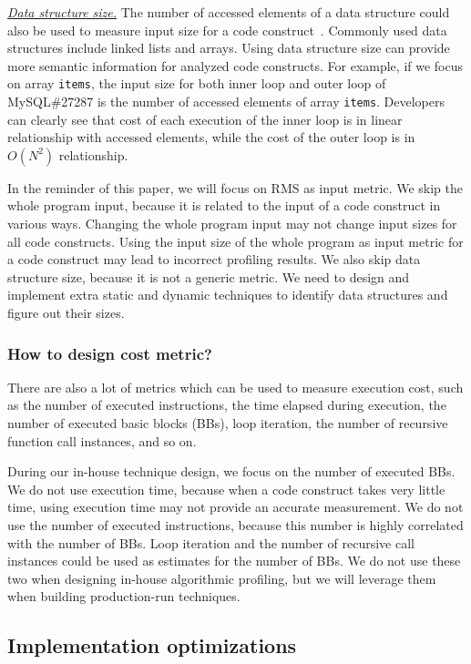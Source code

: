 {\underline{\textit{Data structure size.}}}
The number of accessed elements of a data 
structure could also be used to measure 
input size for a code construct~\cite{AlgoProf}. 
Commonly used data structures include linked lists and arrays.
Using data structure size can provide more semantic information for 
analyzed code constructs.
For example, if we focus on array \texttt{items}, 
the input size for both 
inner loop and outer loop of MySQL\#27287 is 
the number of accessed elements of array \texttt{items}.
Developers can clearly see that cost of each execution 
of the inner loop is in linear relationship with accessed elements, 
while the cost of the outer loop is in $O(N^2)$ relationship. 

In the reminder of this paper, we will focus on RMS as input metric. 
We skip the whole program input, 
because it is related to the input of a code construct in various ways.
Changing the whole program input may not change input sizes for 
all code constructs. 
Using the input size of the whole program as input metric for a code construct
may lead to incorrect profiling results. 
We also skip data structure size,
because it is not a generic metric. 
We need to design and implement extra static and dynamic techniques 
to identify data structures and figure out their sizes.


\subsubsection{How to design cost metric?}
There are also a lot of metrics which can be used to measure execution cost, 
such as the number of executed instructions, 
the time elapsed during execution,
the number of executed basic blocks (BBs), 
loop iteration, 
the number of recursive function call instances, and so on.

During our in-house technique design, 
we focus on the number of executed BBs. 
We do not use execution time, 
because when a code construct takes very little time,
using execution time may not provide an accurate measurement. 
We do not use the number of executed instructions, 
because this number is highly correlated with the number of BBs. 
Loop iteration and the number of recursive call instances could be used as estimates 
for the number of BBs. 
We do not use these two when designing in-house algorithmic profiling, 
but we will leverage them when building production-run techniques.  
 

\subsection{Implementation optimizations}

